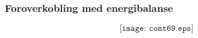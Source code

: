 \documentclass{beamer}
\begin{document}
%
%
%
%
%
%
%
%
\begin{frame}
	\frametitle{Foroverkobling med energibalanse}

	
$$\texttt{[image: cont69.eps]}$$

\end{frame}
\end{document}
